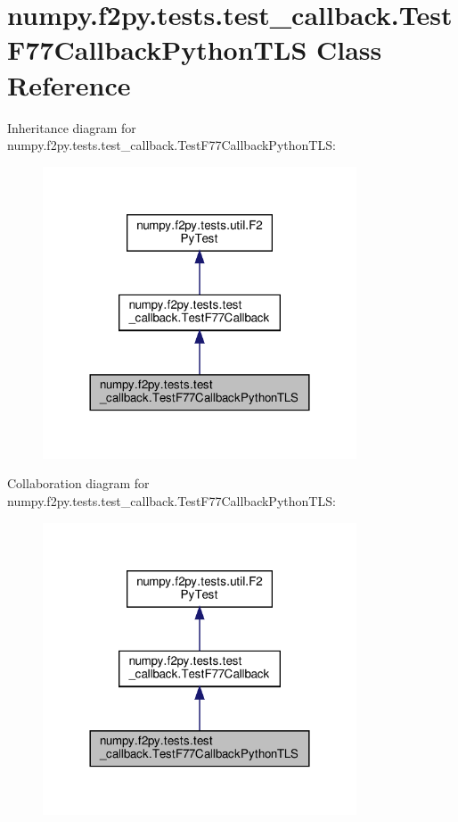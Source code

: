 \hypertarget{classnumpy_1_1f2py_1_1tests_1_1test__callback_1_1TestF77CallbackPythonTLS}{}\section{numpy.\+f2py.\+tests.\+test\+\_\+callback.\+Test\+F77\+Callback\+Python\+T\+LS Class Reference}
\label{classnumpy_1_1f2py_1_1tests_1_1test__callback_1_1TestF77CallbackPythonTLS}


Inheritance diagram for numpy.\+f2py.\+tests.\+test\+\_\+callback.\+Test\+F77\+Callback\+Python\+T\+LS\+:
\nopagebreak
\begin{figure}[H]
\begin{center}
\leavevmode
\includegraphics[width=264pt]{classnumpy_1_1f2py_1_1tests_1_1test__callback_1_1TestF77CallbackPythonTLS__inherit__graph}
\end{center}
\end{figure}


Collaboration diagram for numpy.\+f2py.\+tests.\+test\+\_\+callback.\+Test\+F77\+Callback\+Python\+T\+LS\+:
\nopagebreak
\begin{figure}[H]
\begin{center}
\leavevmode
\includegraphics[width=264pt]{classnumpy_1_1f2py_1_1tests_1_1test__callback_1_1TestF77CallbackPythonTLS__coll__graph}
\end{center}
\end{figure}
